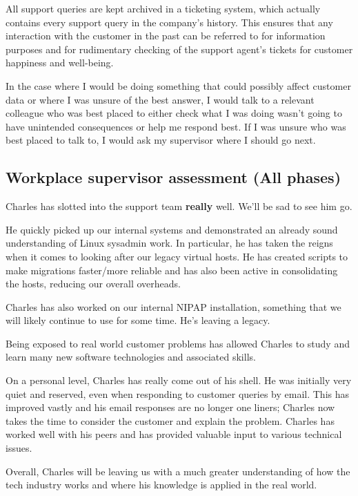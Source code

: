 \documentclass[12pt,a4paper]{article}
\begin{document}
	All support queries are kept archived in a ticketing system, which actually
	contains every support query in the company's history. This ensures that
	any interaction with the customer in the past can be referred to for
	information purposes and for rudimentary checking of the support agent's
	tickets for customer happiness and well-being.

	In the case where I would be doing something that could possibly affect
	customer data or where I was unsure of the best answer, I would talk to a
	relevant colleague who was best placed to either check what I was doing
	wasn't going to have unintended consequences or help me respond best. If I
	was unsure who was best placed to talk to, I would ask my supervisor where I
	should go next.

\subsection*{Workplace supervisor assessment (All phases)}
	Charles has slotted into the support team \textbf{really} well. We'll be sad
	to see him go.

	He quickly picked up our internal systems and demonstrated an already sound
	understanding of Linux sysadmin work. In particular, he has taken the reigns
	when it comes to looking after our legacy virtual hosts. He has created
	scripts to make migrations faster/more reliable and has also been active in
	consolidating the hosts, reducing our overall overheads.

	Charles has also worked on our internal NIPAP installation, something that
	we will likely continue to use for some time. He's leaving a legacy.

	Being exposed to real world customer problems has allowed Charles to study
	and learn many new software technologies and associated skills.

	On a personal level, Charles has really come out of his shell. He was
	initially very quiet and reserved, even when responding to customer queries
	by email. This has improved vastly and his email responses are no longer one
	liners; Charles now takes the time to consider the customer and explain the
	problem. Charles has worked well with his peers and has provided valuable
	input to various technical issues.

	Overall, Charles will be leaving us with a much greater understanding of how
	the tech industry works and where his knowledge is applied in the real
	world.
\end{document}
